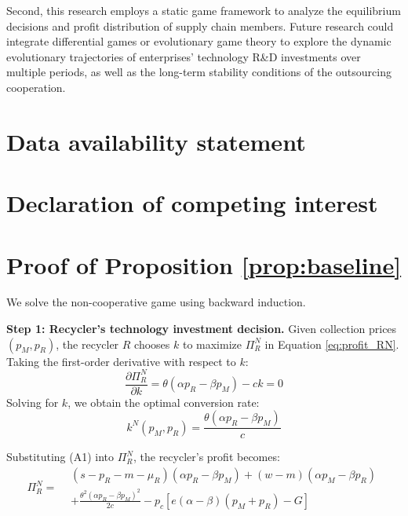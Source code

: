 \documentclass[authoryear,preprint,review,times,10pt]{elsarticle}
\begin{document}
Second, this research employs a static game framework to analyze the equilibrium decisions and profit distribution of supply chain members. Future research could integrate differential games or evolutionary game theory to explore the dynamic evolutionary trajectories of enterprises' technology R\&D investments over multiple periods, as well as the long-term stability conditions of the outsourcing cooperation.

\section*{Data availability statement}

\section*{Declaration of competing interest}


\appendix

\appendix
\section{Proof of Proposition \ref{prop:baseline}}
\label{app:prop1}

We solve the non-cooperative game using backward induction.

\textbf{Step 1: Recycler's technology investment decision.} Given collection prices $(p_M, p_R)$, the recycler $R$ chooses $k$ to maximize $\Pi_R^N$ in Equation \eqref{eq:profit_RN}. Taking the first-order derivative with respect to $k$:
\begin{equation}
\frac{\partial \Pi_R^N}{\partial k} = \theta(\alpha p_R - \beta p_M) - ck = 0
\end{equation}
Solving for $k$, we obtain the optimal conversion rate:
\begin{equation}
k^N(p_M, p_R) = \frac{\theta(\alpha p_R - \beta p_M)}{c}
\tag{A1}
\end{equation}

Substituting (A1) into $\Pi_R^N$, the recycler's profit becomes:
\begin{equation}
\Pi_R^N =
\begin{aligned}
& (s - p_R - m - \mu_R)(\alpha p_R - \beta p_M) + (w - m)(\alpha p_M - \beta p_R) \\
& + \frac{\theta^2(\alpha p_R - \beta p_M)^2}{2c} - p_c\left[ e(\alpha - \beta)(p_M + p_R) - G \right]
\end{aligned}
\tag{A2}
\end{equation}
\end{document}
